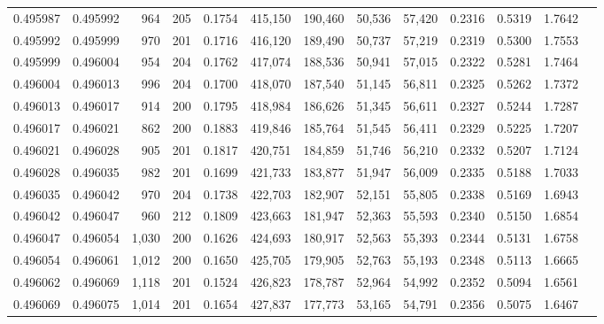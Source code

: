 \begin{tabular}{rrrrrrrrrrrrr}
0.495987 & 0.495992 &   964 & 205 &                                     0.1754 & 415,150 & 190,460 &  50,536 &  57,420 & 0.2316 & 0.5319 & 1.7642 \\
0.495992 & 0.495999 &   970 & 201 &                                     0.1716 & 416,120 & 189,490 &  50,737 &  57,219 & 0.2319 & 0.5300 & 1.7553 \\
0.495999 & 0.496004 &   954 & 204 &                                     0.1762 & 417,074 & 188,536 &  50,941 &  57,015 & 0.2322 & 0.5281 & 1.7464 \\
0.496004 & 0.496013 &   996 & 204 &                                     0.1700 & 418,070 & 187,540 &  51,145 &  56,811 & 0.2325 & 0.5262 & 1.7372 \\
0.496013 & 0.496017 &   914 & 200 &                                     0.1795 & 418,984 & 186,626 &  51,345 &  56,611 & 0.2327 & 0.5244 & 1.7287 \\
0.496017 & 0.496021 &   862 & 200 &                                     0.1883 & 419,846 & 185,764 &  51,545 &  56,411 & 0.2329 & 0.5225 & 1.7207 \\
0.496021 & 0.496028 &   905 & 201 &                                     0.1817 & 420,751 & 184,859 &  51,746 &  56,210 & 0.2332 & 0.5207 & 1.7124 \\
0.496028 & 0.496035 &   982 & 201 &                                     0.1699 & 421,733 & 183,877 &  51,947 &  56,009 & 0.2335 & 0.5188 & 1.7033 \\
0.496035 & 0.496042 &   970 & 204 &                                     0.1738 & 422,703 & 182,907 &  52,151 &  55,805 & 0.2338 & 0.5169 & 1.6943 \\
0.496042 & 0.496047 &   960 & 212 &                                     0.1809 & 423,663 & 181,947 &  52,363 &  55,593 & 0.2340 & 0.5150 & 1.6854 \\
0.496047 & 0.496054 & 1,030 & 200 &                                     0.1626 & 424,693 & 180,917 &  52,563 &  55,393 & 0.2344 & 0.5131 & 1.6758 \\
0.496054 & 0.496061 & 1,012 & 200 &                                     0.1650 & 425,705 & 179,905 &  52,763 &  55,193 & 0.2348 & 0.5113 & 1.6665 \\
0.496062 & 0.496069 & 1,118 & 201 &                                     0.1524 & 426,823 & 178,787 &  52,964 &  54,992 & 0.2352 & 0.5094 & 1.6561 \\
0.496069 & 0.496075 & 1,014 & 201 &                                     0.1654 & 427,837 & 177,773 &  53,165 &  54,791 & 0.2356 & 0.5075 & 1.6467 \\

\end{tabular}

